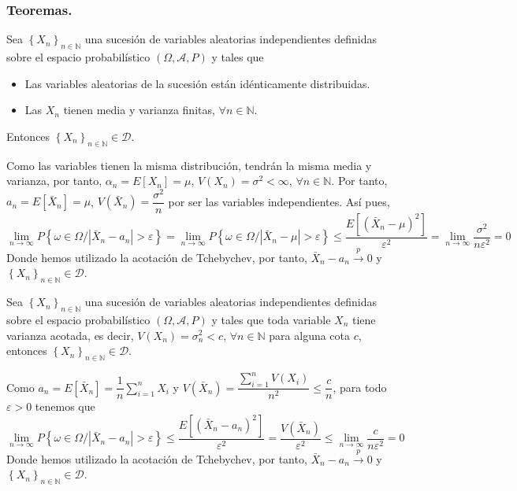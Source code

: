 \subsubsection{Teoremas.}
\begin{teorema}
Sea $ \left\{X_n\right\}_{n\in\mathbb{N}}$ una sucesi\'on de variables aleatorias independientes definidas sobre el espacio probabil\'istico $\left(\Omega,\mathcal{A}, P\right) $ y tales que 
\begin{itemize}
\item Las variables aleatorias de la sucesi\'on est\'an id\'enticamente distribuidas.
\item Las $X_n$ tienen media y varianza finitas, $\forall n\in\mathbb{N}$.
\end{itemize}
Entonces $ \left\{X_n\right\}_{n\in\mathbb{N}}\in\mathscr{D}$.
\end{teorema}

Como las variables tienen la misma distribuci\'on, tendr\'an la misma media y varianza, por tanto, $\alpha_n=E[X_n]=\mu$, $V(X_n)=\sigma^2<\infty$, $\forall n\in\mathbb{N}$. Por tanto, $a_n=E[\bar{X}_n]=\mu$, $V(\bar{X}_n)=\dfrac{\sigma^2}{n}$ por ser las variables independientes. As\'i pues,
\begin{equation*}
\lim_{n\to\infty}P\left\{\omega\in\Omega/\left|\bar{X}_n-a_n\right|>\varepsilon\right\}=\lim_{n\to\infty}P\left\{\omega\in\Omega/\left|\bar{X}_n-\mu\right|>\varepsilon\right\}\le \dfrac{E[(\bar{X}_n-\mu)^2]}{\varepsilon^2}=\lim_{n\to\infty}\dfrac{\sigma^2}{n\varepsilon^2}=0
\end{equation*}
Donde hemos utilizado la acotaci\'on de Tchebychev, por tanto, $\bar{X}_n-a_n\overset{p}{\to} 0$ y $\left\{X_n\right\}_{n\in\mathbb{N}}\in\mathscr{D}$.

\begin{teorema}[Tchebychev]
Sea $ \left\{X_n\right\}_{n\in\mathbb{N}}$ una sucesi\'on de variables aleatorias independientes definidas sobre el espacio probabil\'istico $\left(\Omega,\mathcal{A}, P\right) $ y tales que toda variable $X_n$ tiene varianza acotada, es decir, $V(X_n)=\sigma_n^2<c$, $\forall n\in\mathbb{N}$ para alguna cota $c$, entonces $ \left\{X_n\right\}_{n\in\mathbb{N}}\in\mathscr{D}$.
\end{teorema}
Como $a_n=E[\bar{X}_n]=\dfrac{1}{n}\sum_{i=1}^nX_i$ y $V(\bar{X}_n)=\dfrac{\sum_{i=1}^nV(X_i)}{n^2}\leq\dfrac{c}{n}$, para todo $\varepsilon>0$ tenemos que
\begin{equation*}
\lim_{n\to\infty}P\left\{\omega\in\Omega/\left|\bar{X}_n-a_n\right|>\varepsilon\right\}\le \dfrac{E[(\bar{X}_n-a_n)^2]}{\varepsilon^2}=\dfrac{V(\bar{X}_n)}{\varepsilon^2}\leq\lim_{n\to\infty}\dfrac{c}{n\varepsilon^2}=0
\end{equation*}
Donde hemos utilizado la acotaci\'on de Tchebychev, por tanto, $\bar{X}_n-a_n\overset{p}{\to} 0$ y $\left\{X_n\right\}_{n\in\mathbb{N}}\in\mathscr{D}$.


